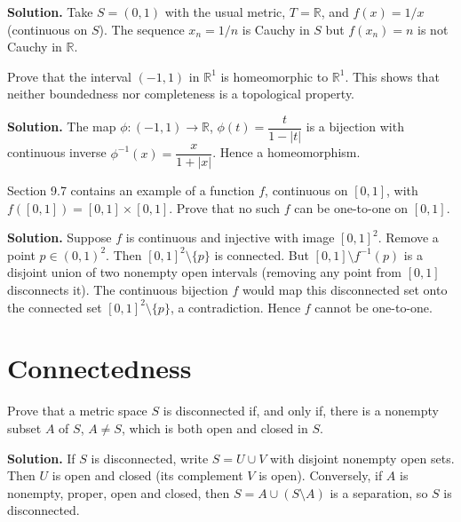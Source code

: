 \noindent\textbf{Solution.}
Take $S=(0,1)$ with the usual metric, $T=\mathbb{R}$, and $f(x)=1/x$ (continuous on $S$). The sequence $x_n=1/n$ is Cauchy in $S$ but $f(x_n)=n$ is not Cauchy in $\mathbb{R}$.
\medskip

\begin{problembox}
Prove that the interval $(-1, 1)$ in $\mathbb{R}^1$ is homeomorphic to $\mathbb{R}^1$. This shows that neither boundedness nor completeness is a topological property.
\end{problembox}

\noindent\textbf{Solution.}
The map $\phi:(-1,1)\to\mathbb{R}$, $\phi(t)=\dfrac{t}{1-|t|}$ is a bijection with continuous inverse $\phi^{-1}(x)=\dfrac{x}{1+|x|}$. Hence a homeomorphism.
\medskip

\begin{problembox}
Section 9.7 contains an example of a function $f$, continuous on $[0, 1]$, with $f([0, 1]) = [0, 1] \times [0, 1]$. Prove that no such $f$ can be one-to-one on $[0, 1]$.
\end{problembox}

\noindent\textbf{Solution.}
Suppose $f$ is continuous and injective with image $[0,1]^2$. Remove a point $p\in(0,1)^2$. Then $[0,1]^2\setminus\{p\}$ is connected. But $[0,1]\setminus f^{-1}(p)$ is a disjoint union of two nonempty open intervals (removing any point from $[0,1]$ disconnects it). The continuous bijection $f$ would map this disconnected set onto the connected set $[0,1]^2\setminus\{p\}$, a contradiction. Hence $f$ cannot be one-to-one.
\medskip

\section{Connectedness}

\begin{problembox}
Prove that a metric space $S$ is disconnected if, and only if, there is a nonempty subset $A$ of $S$, $A \neq S$, which is both open and closed in $S$.
\end{problembox}

\noindent\textbf{Solution.}
If $S$ is disconnected, write $S=U\cup V$ with disjoint nonempty open sets. Then $U$ is open and closed (its complement $V$ is open). Conversely, if $A$ is nonempty, proper, open and closed, then $S=A\cup(S\setminus A)$ is a separation, so $S$ is disconnected.
\medskip

